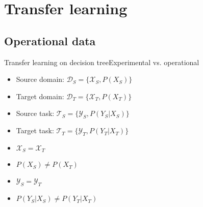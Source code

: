 \section{Transfer learning}
\subsection{Operational data}
\begin{frame}{Transfer learning on decision tree}{Experimental vs. operational}
\begin{minipage}[t]{0.49\linewidth}
    \vspace{0pt}
    \begin{itemize}
        \item Source domain: $\mathcal{D}_{S} = \{\mathcal{X}_{S}, P(X_{S})\}$\\
        \item Target domain: $\mathcal{D}_{T} = \{\mathcal{X}_{T}, P(X_{T})\}$\\
        \item Source task: $\mathcal{T}_{S} = \{\mathcal{Y}_{S}, P(Y_{S}|X_{S})\}$\\
        \item Target task: $\mathcal{T}_{T} = \{\mathcal{Y}_{T}, P(Y_{T}|X_{T})\}$\\
    \end{itemize}
\end{minipage}
\begin{minipage}[t]{0.49\linewidth}
    \vspace{0pt}
    \begin{itemize}%
        \item $\mathcal{X}_{S} = \mathcal{X}_{T}$
        \item \textcolor{myorange}{$P(X_{S}) \neq P(X_{T})$}
        \item $\mathcal{Y}_{S} = \mathcal{Y}_{T}$
        \item \textcolor{myorange}{$P(Y_{S}|X_{S}) \neq P(Y_{T}|X_{T})$}
    \end{itemize}
\end{minipage}


\end{frame}
